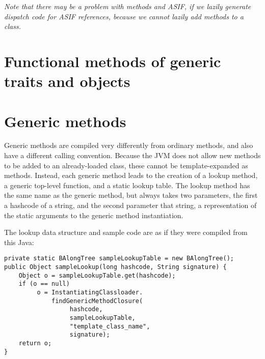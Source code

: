 \documentclass[11pt]{article}
\begin{document}
{\it Note that there may be a problem with methods and ASIF, if we lazily generate dispatch code for ASIF references, because we cannot lazily add methods to a class. }

\section{Functional methods of generic traits and objects}




\section{Generic methods}

Generic methods are compiled very differently from ordinary methods, and also have a different calling convention.
Because the JVM does not allow new methods to be added to an already-loaded class, these cannot be template-expanded as methods.
Instead, each generic method leads to the creation of a lookup method, a generic top-level function, and a static lookup table.  The lookup method has the same name as the generic method, but always takes two parameters, the first a hashcode of a string, and the second parameter that string, a representation of the static arguments to the generic method instantiation.

The lookup data structure and sample code are as if they were compiled from this Java:
\begin{verbatim}
private static BAlongTree sampleLookupTable = new BAlongTree();
public Object sampleLookup(long hashcode, String signature) {
    Object o = sampleLookupTable.get(hashcode);
    if (o == null) 
         o = InstantiatingClassloader.
             findGenericMethodClosure(
                  hashcode,
                  sampleLookupTable,
                  "template_class_name",
                  signature);
    return o;
}
\end{verbatim}
\end{document}
